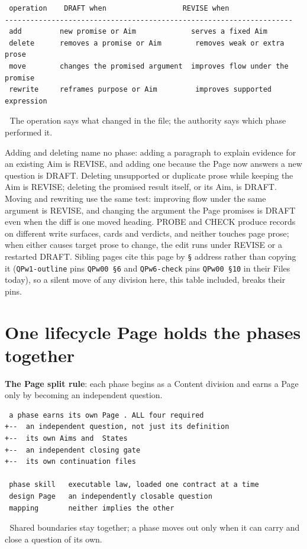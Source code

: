 \begin{verbatim}
 operation    DRAFT when                  REVISE when
--------------------------------------------------------------------
 add         new promise or Aim             serves a fixed Aim
 delete      removes a promise or Aim        removes weak or extra prose
 move        changes the promised argument  improves flow under the promise
 rewrite     reframes purpose or Aim         improves supported expression
\end{verbatim}
📌 The operation says what changed in the file; the authority says which phase performed it.

Adding and deleting name no phase: adding a paragraph to explain evidence for an existing Aim is REVISE, and adding one because the Page now answers a new question is DRAFT. Deleting unsupported or duplicate prose while keeping the Aim is REVISE; deleting the promised result itself, or its Aim, is DRAFT. Moving and rewriting use the same test: improving flow under the same argument is REVISE, and changing the argument the Page promises is DRAFT even when the diff is one moved heading. PROBE and CHECK produce records on different write surfaces, cards and verdicts, and neither touches page prose; when either causes target prose to change, the edit runs under REVISE or a restarted DRAFT. Sibling pages cite this page by \texttt{§} address rather than copying it (\texttt{QPw1-outline} pins \texttt{QPw00 §6} and \texttt{QPw6-check} pins \texttt{QPw00 §10} in their Files today), so a silent move of any division here, this table included, breaks their pins.


\section{One lifecycle Page holds the phases together}
\textbf{The Page split rule}: each phase begins as a Content division and earns a Page only by becoming an independent question.

\begin{verbatim}
 a phase earns its own Page . ALL four required
+--  an independent question, not just its definition
+--  its own Aims and  States
+--  an independent closing gate
+--  its own continuation files

 phase skill   executable law, loaded one contract at a time
 design Page   an independently closable question
 mapping       neither implies the other
\end{verbatim}
📌 Shared boundaries stay together; a phase moves out only when it can carry and close a question of its own.

